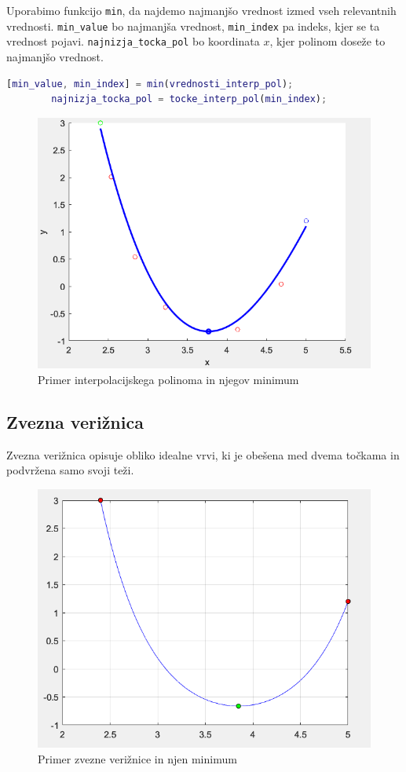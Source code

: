 \documentclass{article}
\begin{document}
        Uporabimo funkcijo \texttt{min}, da najdemo najmanjšo vrednost izmed vseh relevantnih vrednosti. \texttt{min\_value} bo najmanjša vrednost, \texttt{min\_index} pa indeks, kjer se ta vrednost pojavi. \texttt{najnizja\_tocka\_pol} bo koordinata \( x \), kjer polinom doseže to najmanjšo vrednost.

        \begin{lstlisting}[language=Matlab]
        [min_value, min_index] = min(vrednosti_interp_pol);
        najnizja_tocka_pol = tocke_interp_pol(min_index);
        \end{lstlisting}
        
        \begin{figure}
            \centering
            \includegraphics[width=0.8\linewidth]{najnizjaInterpolacijskegaPolinoma.png}
            \caption{Primer interpolacijskega polinoma in njegov minimum}
            \label{fig:enter-label}
        \end{figure}


    \subsection*{Zvezna verižnica}
        Zvezna verižnica opisuje obliko idealne vrvi, ki je obešena med dvema točkama in podvržena samo svoji teži. 
        
        \begin{figure}[h!]
        \centering
        \includegraphics[width=0.8\linewidth]{zveznaVeriznica.png}
        \caption{Primer zvezne verižnice in njen minimum}
        \label{slika3:interpolacija}
        \end{figure}
        \medskip
\end{document}
